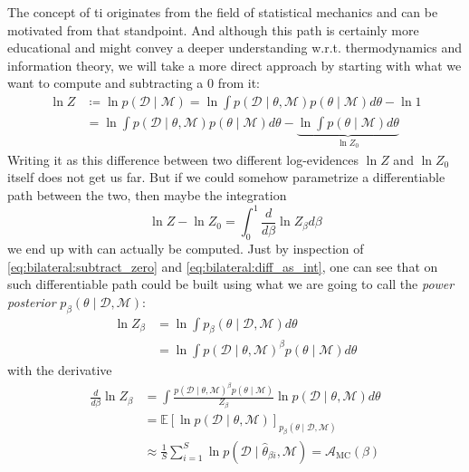 \documentclass[\relativeRoot/main.tex]{subfiles}
\begin{document}
The concept of \gls{ti} originates from the field of statistical mechanics and can be motivated from that standpoint. And although this path is certainly more educational and might convey a deeper understanding w.r.t. thermodynamics and information theory, we will take a more direct approach by starting with what we want to compute and subtracting a 0 from it:
%
\begin{equation} \label{eq:bilateral:subtract_zero}
    \begin{aligned}
        \ln{Z} &\coloneqq \ln{p(\boldsymbol{\mathcal{D}} \mid \mathcal{M})} = \ln{\int{ p\left( \boldsymbol{\mathcal{D}} \mid \theta, \mathcal{M} \right) p(\theta \mid \mathcal{M}) d\theta}} - \ln{1} \\
        &= \ln{\int{ p\left( \boldsymbol{\mathcal{D}} \mid \theta, \mathcal{M} \right) p(\theta \mid \mathcal{M}) d\theta}} - \underbrace{ \ln{ \int{ p(\theta \mid \mathcal{M}) d\theta} } }_{\ln{Z_0}}
    \end{aligned}
\end{equation}
%
Writing it as this difference between two different log-evidences $\ln{Z}$ and $\ln{Z_0}$ itself does not get us far. But if we could somehow parametrize a differentiable path between the two, then maybe the integration
%
\begin{equation} \label{eq:bilateral:diff_as_int}
    \ln{Z} - \ln{Z_0} = \int_0^1{ \frac{d}{d\beta} \ln{Z_\beta} d\beta}
\end{equation}
%
we end up with can actually be computed. Just by inspection of \cref{eq:bilateral:subtract_zero} and \cref{eq:bilateral:diff_as_int}, one can see that on such differentiable path could be built using what we are going to call the \emph{power posterior} $p_\beta (\theta \mid \boldsymbol{\mathcal{D}}, \mathcal{M})$:
%
\begin{equation} \label{eq:bilateral:power_post}
    \begin{aligned}
        \ln{Z_\beta} &= \ln{ \int{ p_\beta (\theta \mid \boldsymbol{\mathcal{D}}, \mathcal{M}) d\theta} } \\
        &= \ln{\int{ p\left( \boldsymbol{\mathcal{D}} \mid \theta, \mathcal{M} \right)^\beta p(\theta \mid \mathcal{M}) d\theta}}
    \end{aligned}
\end{equation}
%
with the derivative
%
\begin{equation}
    \begin{aligned}
        \frac{d}{d\beta} \ln{Z_\beta} &= \int{ \frac{p\left( \boldsymbol{\mathcal{D}} \mid \theta, \mathcal{M} \right)^\beta p(\theta \mid \mathcal{M})}{Z_\beta} \ln{p(\boldsymbol{\mathcal{D}} \mid \theta, \mathcal{M} )} d\theta} \\
        &= \mathbb{E}\left[ \ln{ p(\boldsymbol{\mathcal{D}} \mid \theta, \mathcal{M}) } \right]_{p_\beta (\theta \mid \boldsymbol{\mathcal{D}}, \mathcal{M})} \\
        &\approx \frac{1}{S} \sum_{i=1}^S{ \ln{ p(\boldsymbol{\mathcal{D}} \mid \hat{\theta}_{\beta i}, \mathcal{M}) } } = \mathcal{A}_\text{MC}(\beta)
    \end{aligned}
\end{equation}
\end{document}
